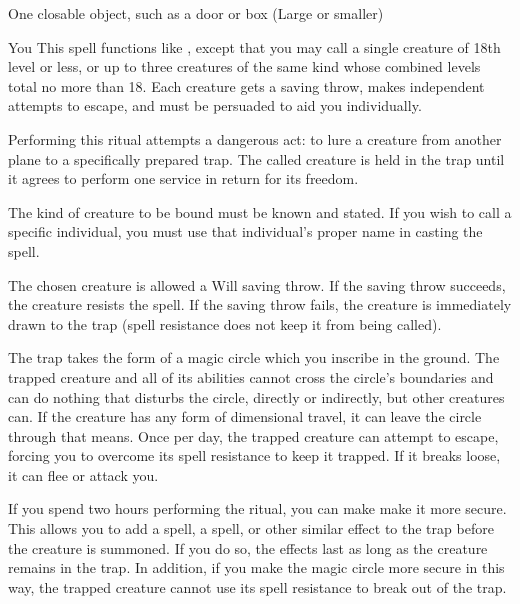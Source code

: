 \begin{spelltarget}{One closable object, such as a door or box (Large or smaller)}
\begin{spelltarget}{You}
\spelleffect This spell functions like , except that you may call a single creature of 18th level or less, or up to three creatures of the same kind whose combined levels total no more than 18. Each creature gets a saving throw, makes independent attempts to escape, and must be persuaded to aid you individually.

\spelleffect Performing this ritual attempts a dangerous act: to lure a creature from another plane to a specifically prepared trap. The called creature is held in the trap until it agrees to perform one service in return for its freedom.
\par The kind of creature to be bound must be known and stated. If you wish to call a specific individual, you must use that individual's proper name in casting the spell.
\par The chosen creature is allowed a Will saving throw. If the saving throw succeeds, the creature resists the spell. If the saving throw fails, the creature is immediately drawn to the trap (spell resistance does not keep it from being called).
\par The trap takes the form of a magic circle which you inscribe in the ground. The trapped creature and all of its abilities cannot cross the circle's boundaries and can do nothing that disturbs the circle, directly or indirectly, but other creatures can. If the creature has any form of dimensional travel, it can leave the circle through that means. Once per day, the trapped creature can attempt to escape, forcing you to overcome its spell resistance to keep it trapped. If it breaks loose, it can flee or attack you.
\par If you spend two hours performing the ritual, you can make make it more secure. This allows you to add a  spell, a  spell, or other similar effect to the trap before the creature is summoned. If you do so, the effects last as long as the creature remains in the trap. In addition, if you make the magic circle more secure in this way, the trapped creature cannot use its spell resistance to break out of the trap.

\end{spelltarget}
\end{spelltarget}
